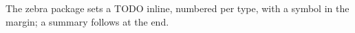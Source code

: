 \documentclass[11pt]{article}\usepackage[paperwidth=14cm,paperheight=7cm,left=1cm,right=3.6cm,top=1cm,bottom=1cm,marginparwidth=2.6cm,marginparsep=3mm]{geometry}\pagestyle{empty}
\begin{document}
The zebra package sets a TODO inline, numbered per type, with a symbol in the margin; a summary follows at the end.
\clearpage %
\end{document}
